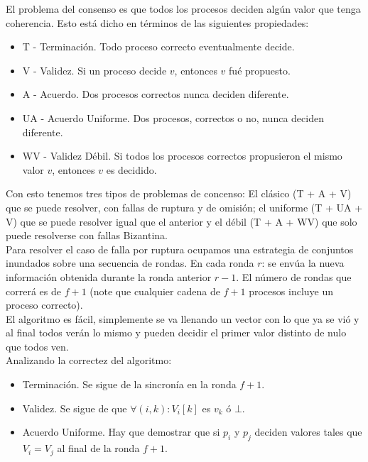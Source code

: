 \documentclass{article}
\begin{document}
\begin{enumerate}
{       El problema del consenso es que todos los procesos deciden algún valor que
       tenga coherencia. Esto está dicho en términos de las siguientes propiedades:\\
       \begin{itemize}
        \item { T - Terminación. Todo proceso correcto eventualmente decide. }
        \item { V - Validez. Si un proceso decide $v$, entonces $v$ fué propuesto. }
        \item { A - Acuerdo. Dos procesos correctos nunca deciden diferente. }
        \item { UA - Acuerdo Uniforme. Dos procesos, correctos o no, nunca deciden
        diferente. }
        \item { WV - Validez Débil. Si todos los procesos correctos propusieron
        el mismo valor $v$, entonces $v$ es decidido. }
      \end{itemize}
      Con esto tenemos tres tipos de problemas de concenso: El clásico (T + A + V)
      que se puede resolver, con fallas de ruptura y de omisión; el uniforme (T + UA + 
      V) que se puede resolver igual que el anterior y el débil (T + A + WV) que solo
      puede resolverse con fallas Bizantina.\\
      Para resolver el caso de falla por ruptura ocupamos una estrategia de conjuntos
      inundados sobre una secuencia de rondas. En cada ronda $r$: se envúa la nueva
      información obtenida durante la ronda anterior $r - 1$. El número de rondas
      que correrá es de $f + 1$ (note que cualquier cadena de $f + 1$ procesos incluye
      un proceso correcto).\\
      El algoritmo es fácil, simplemente se va llenando un vector con lo que ya se vió
      y al final todos verán lo mismo y pueden decidir el primer valor distinto de nulo
      que todos ven.\\
      Analizando la correctez del algoritmo:
      \begin{itemize}
        \item { Terminación. Se sigue de la sincronía en la ronda $f + 1$. }
        \item { Validez. Se sigue de que $\forall(i, k): V_{i}[k]$ es $v_{k}$ ó
        $\bot$. }
        \item { Acuerdo Uniforme. Hay que demostrar que si $p_{i}$ y $p_{j}$ deciden
        valores tales que $V_{i} = V_{j}$ al final de la ronda $f + 1$.\\
}
\end{itemize}}
\end{enumerate}
\end{document}
